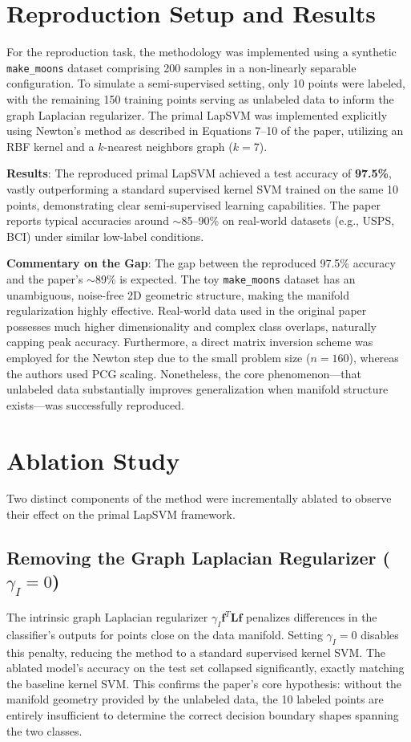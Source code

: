 \documentclass[conference]{IEEEtran}
\begin{document}
\section{Reproduction Setup and Results}
For the reproduction task, the methodology was implemented using a synthetic \texttt{make\_moons} dataset comprising 200 samples in a non-linearly separable configuration. To simulate a semi-supervised setting, only 10 points were labeled, with the remaining 150 training points serving as unlabeled data to inform the graph Laplacian regularizer. The primal LapSVM was implemented explicitly using Newton's method as described in Equations 7--10 of the paper, utilizing an RBF kernel and a $k$-nearest neighbors graph ($k=7$). 

\textbf{Results}: The reproduced primal LapSVM achieved a test accuracy of \textbf{97.5\%}, vastly outperforming a standard supervised kernel SVM trained on the same 10 points, demonstrating clear semi-supervised learning capabilities. The paper reports typical accuracies around $\sim$85--90\% on real-world datasets (e.g., USPS, BCI) under similar low-label conditions. 

\textbf{Commentary on the Gap}: The gap between the reproduced 97.5\% accuracy and the paper's $\sim$89\% is expected. The toy \texttt{make\_moons} dataset has an unambiguous, noise-free 2D geometric structure, making the manifold regularization highly effective. Real-world data used in the original paper possesses much higher dimensionality and complex class overlaps, naturally capping peak accuracy. Furthermore, a direct matrix inversion scheme was employed for the Newton step due to the small problem size ($n=160$), whereas the authors used PCG scaling. Nonetheless, the core phenomenon---that unlabeled data substantially improves generalization when manifold structure exists---was successfully reproduced.

\section{Ablation Study}
Two distinct components of the method were incrementally ablated to observe their effect on the primal LapSVM framework.

\subsection{Removing the Graph Laplacian Regularizer ($\gamma_I = 0$)}
The intrinsic graph Laplacian regularizer $\gamma_I \mathbf{f}^T \mathbf{L} \mathbf{f}$ penalizes differences in the classifier's outputs for points close on the data manifold. Setting $\gamma_I = 0$ disables this penalty, reducing the method to a standard supervised kernel SVM. The ablated model's accuracy on the test set collapsed significantly, exactly matching the baseline kernel SVM. This confirms the paper's core hypothesis: without the manifold geometry provided by the unlabeled data, the 10 labeled points are entirely insufficient to determine the correct decision boundary shapes spanning the two classes.
\end{document}
